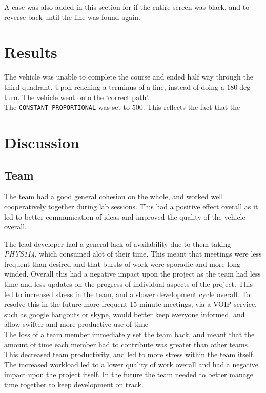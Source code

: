 \documentclass[paper=a4, fontsize=11pt]{scrartcl} %
\numberwithin{equation}{section} %
\numberwithin{figure}{section} %
\begin{document}
A case was also added in this section for if the entire screen was black, and to
reverse back until the line was found again.


\section{Results}
The vehicle was unable to complete the course and ended half way through the
third quadrant. Upon reaching a terminus of a line, instead of doing a $180\deg$
turn. The vehicle went onto the `correct path'.\\
The \verb|CONSTANT_PROPORTIONAL| was set to $500$. This reflects the fact that
the 

\section{Discussion}
\subsection{Team}
The team had a good general cohesion on the whole, and worked well cooperatively
together during lab sessions. This had a positive effect overall as it led to
better communication of ideas and improved the quality of the vehicle overall.

The lead developer had a general lack of availability due to them
taking \textit{PHYS114}, which consumed alot of their time. This meant that
meetings were less frequent than desired and that bursts of work were
sporadic and more long-winded. Overall this had a negative impact upon the
project as the team had less time and less updates on the progress of individual
aspects of the project.  This led to increased stress in the team, and a slower
development cycle overall. To resolve this in the future more frequent 15 minute
meetings, via a VOIP service, such as google hangouts or skype, would better
keep everyone informed, and allow swifter and more productive use of time\\

The loss of a team member immediately set the team back, and meant that the
amount of time each member had to contribute was greater than other teams. This
decreased team productivity, and led to more stress within the team itself. The
increased workload led to a lower quality of work overall and had a negative
impact upon the project itself. In the future the team needed to better manage
time together to keep development on track.\\
\end{document}
